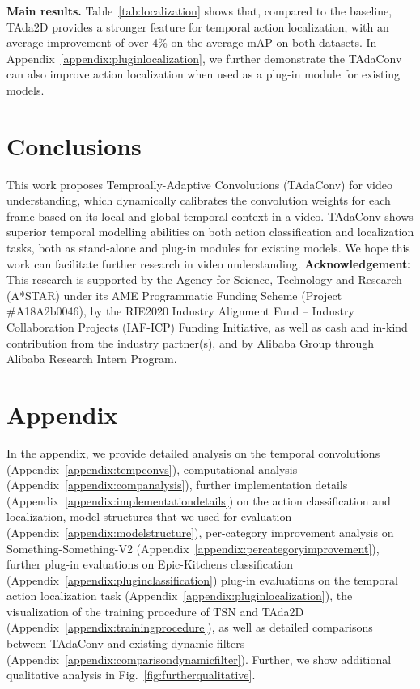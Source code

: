 \documentclass{article} \usepackage{iclr2022_conference,times}
\begin{document}
\textbf{Main results.} 
Table~\ref{tab:localization} shows that, compared to the baseline, TAda2D provides a stronger feature for temporal action localization, with an average improvement of over 4\% on the average mAP on both datasets. In Appendix~\ref{appendix:pluginlocalization}, we further demonstrate the TAdaConv can also improve action localization when used as a plug-in module for existing models.

\section{Conclusions}
This work proposes Temproally-Adaptive Convolutions (TAdaConv) for video understanding, which dynamically calibrates the convolution weights for each frame based on its local and global temporal context in a video. 
TAdaConv shows superior temporal modelling abilities on both action classification and localization tasks, both as stand-alone and plug-in modules for existing models.
We hope this work can facilitate further research in video understanding.
\newpage
\textbf{Acknowledgement:} This research is supported by the Agency for Science, Technology and Research (A*STAR) under its AME Programmatic Funding Scheme (Project \#A18A2b0046), by the RIE2020 Industry Alignment Fund – Industry Collaboration Projects (IAF-ICP) Funding Initiative, as well as cash and in-kind contribution from the industry partner(s), and by Alibaba Group through Alibaba Research Intern Program. 




\clearpage

\appendix
\renewcommand{\thetable}{A\arabic{table}}
\renewcommand{\thefigure}{A\arabic{figure}}
\setcounter{figure}{0}
\setcounter{table}{0}
\section*{Appendix}
In the appendix, we provide detailed analysis on the temporal convolutions (Appendix~\ref{appendix:tempconvs}), computational analysis (Appendix~\ref{appendix:companalysis}), further implementation details (Appendix~\ref{appendix:implementationdetails}) on the action classification and localization, model structures that we used for evaluation (Appendix~\ref{appendix:modelstructure}), per-category improvement analysis on Something-Something-V2 (Appendix~\ref{appendix:percategoryimprovement}), further plug-in evaluations on Epic-Kitchens classification (Appendix~\ref{appendix:pluginclassification}) plug-in evaluations on the temporal action localization task (Appendix~\ref{appendix:pluginlocalization}), the visualization of the training procedure of TSN and TAda2D (Appendix~\ref{appendix:trainingprocedure}), as well as detailed comparisons between TAdaConv and existing dynamic filters (Appendix~\ref{appendix:comparisondynamicfilter}).
Further, we show additional qualitative analysis in Fig.~\ref{fig:furtherqualitative}.
\end{document}
